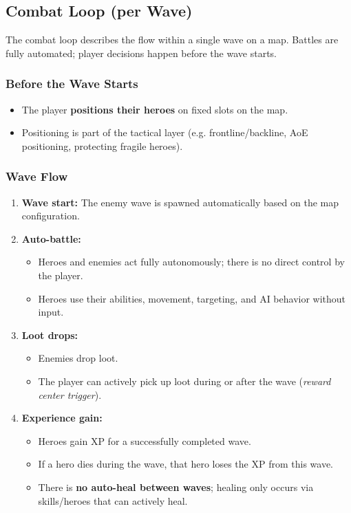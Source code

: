 
\subsection{Combat Loop (per Wave)}

The combat loop describes the flow within a single wave on a map. Battles are fully automated; player decisions happen before the wave starts.

\subsubsection*{Before the Wave Starts}

\begin{itemize}
	\item The player \textbf{positions their heroes} on fixed slots on the map.
	\item Positioning is part of the tactical layer (e.g. frontline/backline, AoE positioning, protecting fragile heroes).
\end{itemize}

\subsubsection*{Wave Flow}

\begin{enumerate}
	\item \textbf{Wave start:} The enemy wave is spawned automatically based on the map configuration.
	\item \textbf{Auto-battle:}
	\begin{itemize}
		\item Heroes and enemies act fully autonomously; there is no direct control by the player.
		\item Heroes use their abilities, movement, targeting, and AI behavior without input.
	\end{itemize}
	\item \textbf{Loot drops:}
	\begin{itemize}
		\item Enemies drop loot.
		\item The player can actively pick up loot during or after the wave (\emph{reward center trigger}).
	\end{itemize}
	\item \textbf{Experience gain:}
	\begin{itemize}
		\item Heroes gain XP for a successfully completed wave.
		\item If a hero dies during the wave, that hero loses the XP from this wave.
		\item There is \textbf{no auto-heal between waves}; healing only occurs via skills/heroes that can actively heal.
	\end{itemize}
\end{enumerate}

